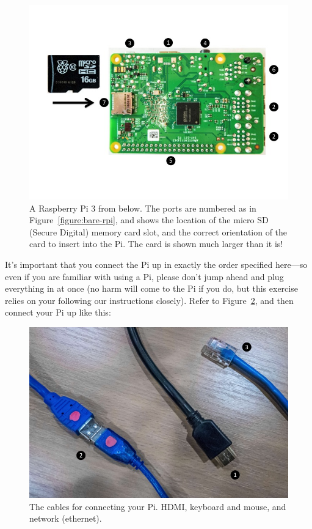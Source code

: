 \begin{figure}
\centerline{\includegraphics[width=15cm]{images/pi3bot.jpg}}
\caption{A Raspberry Pi 3 from below. The ports are numbered as in Figure~\ref{figure:bare-rpi}, and \protect{} shows the location of the micro SD (Secure Digital) memory card slot, and the correct orientation of the card to insert into the Pi. The card is shown much larger than it is!}\label{figure:bare-rpi-underside}
\end{figure}

It's important that you connect the Pi up in exactly the order specified here---so even if you are familiar with using a Pi, please don't jump ahead and plug everything in at once (no harm will come to the Pi if you do, but this exercise relies on your following our instructions closely). Refer to Figure~\ref{figure:cables}, and then connect your Pi up like this:

\begin{figure}
\centerline{\includegraphics[width=13cm]{images/cablesAY17}}
\caption{The cables for connecting your Pi. \protect{} HDMI, \protect{} keyboard and mouse, and \protect{} network (ethernet).}\label{figure:cables}
\end{figure}

